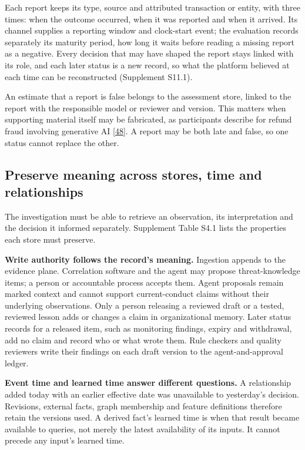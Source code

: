 \documentclass[acmlarge,review,anonymous,nonacm]{acmart}
\begin{document}
Each report keeps its type, source and attributed transaction or entity,
with three times: when the outcome occurred, when it was reported and
when it arrived. Its channel supplies a reporting window and clock-start
event; the evaluation records separately its maturity period, how long
it waits before reading a missing report as a negative. Every decision
that may have shaped the report stays linked with its role, and each
later status is a new record, so what the platform believed at each time
can be reconstructed (Supplement S11.1).

An estimate that a report is false belongs to the assessment store,
linked to the report with the responsible model or reviewer and version.
This matters when supporting material itself may be fabricated, as
participants describe for refund fraud involving generative AI
{[}\protect\hyperlink{ref-Zhang2026Refund}{48}{]}. A report may be both
late and false, so one status cannot replace the other.

\hypertarget{preserve-meaning-across-stores-time-and-relationships}{%
\subsection{Preserve meaning across stores, time and
relationships}\label{preserve-meaning-across-stores-time-and-relationships}}

The investigation must be able to retrieve an observation, its
interpretation and the decision it informed separately. Supplement Table
S4.1 lists the properties each store must preserve.

\textbf{Write authority follows the record's meaning.} Ingestion appends
to the evidence plane. Correlation software and the agent may propose
threat-knowledge items; a person or accountable process accepts them.
Agent proposals remain marked context and cannot support current-conduct
claims without their underlying observations. Only a person releasing a
reviewed draft or a tested, reviewed lesson adds or changes a claim in
organizational memory. Later status records for a released item, such as
monitoring findings, expiry and withdrawal, add no claim and record who
or what wrote them. Rule checkers and quality reviewers write their
findings on each draft version to the agent-and-approval ledger.

\textbf{Event time and learned time answer different questions.} A
relationship added today with an earlier effective date was unavailable
to yesterday's decision. Revisions, external facts, graph membership and
feature definitions therefore retain the versions used. A derived fact's
learned time is when that result became available to queries, not merely
the latest availability of its inputs. It cannot precede any input's
learned time.
\end{document}
